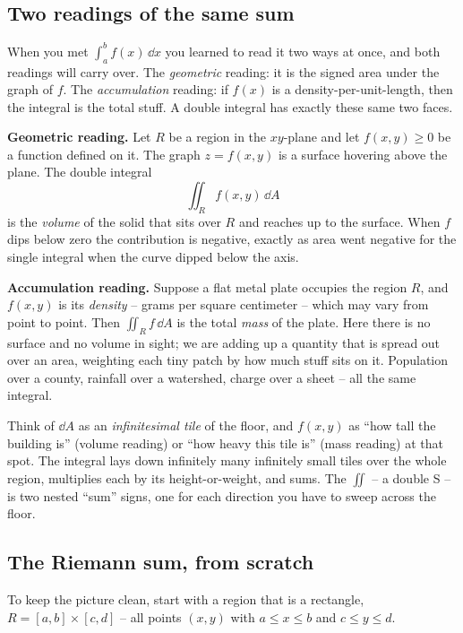 \subsection{Two readings of the same sum}

When you met $\int_a^b f(x)\,\dd x$ you learned to read it two ways at once, and
both readings will carry over. The \emph{geometric} reading: it is the signed
area under the graph of $f$. The \emph{accumulation} reading: if $f(x)$ is a
density-per-unit-length, then the integral is the total stuff. A double integral
has exactly these same two faces.

\textbf{Geometric reading.} Let $R$ be a region in the $xy$-plane and let
$f(x,y)\ge 0$ be a function defined on it. The graph $z=f(x,y)$ is a surface
hovering above the plane. The double integral
\[
  \iint_R f(x,y)\,\dd A
\]
is the \emph{volume} of the solid that sits over $R$ and reaches up to the
surface. When $f$ dips below zero the contribution is negative, exactly as area
went negative for the single integral when the curve dipped below the axis.

\textbf{Accumulation reading.} Suppose a flat metal plate occupies the region
$R$, and $f(x,y)$ is its \emph{density} -- grams per square centimeter -- which
may vary from point to point. Then $\iint_R f\,\dd A$ is the total \emph{mass} of
the plate. Here there is no surface and no volume in sight; we are adding
up a quantity that is spread out over an area, weighting each tiny patch by how
much stuff sits on it. Population over a county, rainfall over a watershed,
charge over a sheet -- all the same integral.

\begin{intuitionbox}
Think of $\dd A$ as an \emph{infinitesimal tile} of the floor, and $f(x,y)$ as
``how tall the building is'' (volume reading) or ``how heavy this tile is''
(mass reading) at that spot. The integral lays down infinitely many infinitely
small tiles over the whole region, multiplies each by its height-or-weight, and
sums. The $\iint$ -- a double S -- is two nested ``sum'' signs, one for each
direction you have to sweep across the floor.
\end{intuitionbox}

\subsection{The Riemann sum, from scratch}

To keep the picture clean, start with a region that is a rectangle,
$R=[a,b]\times[c,d]$ -- all points $(x,y)$ with $a\le x\le b$ and $c\le y\le d$.

